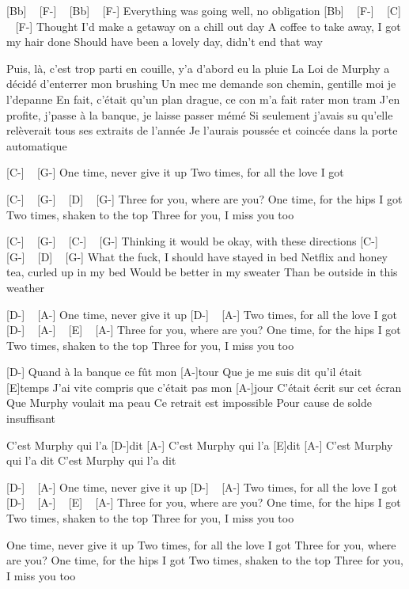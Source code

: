 
[Bb] ~ [F-] ~ [Bb] ~ [F-] 
Everything was going well, no obligation
[Bb] ~ [F-] ~ [C] ~ [F-]
Thought I'd make a getaway on a chill out day
A coffee to take away, I got my hair done
Should have been a lovely day, didn't end that way


Puis, là, c'est trop parti en couille, y'a d'abord eu la pluie
La Loi de Murphy a décidé d'enterrer mon brushing
Un mec me demande son chemin, gentille moi je l'depanne
En fait, c'était qu'un plan drague, ce con m'a fait rater mon tram
J'en profite, j'passe à la banque, je laisse passer mémé
Si seulement j'avais su qu'elle relèverait tous ses extraits de l'année
Je l'aurais poussée et coincée dans la porte automatique

[C-] ~ [G-]
One time, never give it up
Two times, for all the love I got

[C-] ~ [G-] ~ [D] ~ [G-]
Three for you, where are you?
One time, for the hips I got
Two times, shaken to the top
Three for you, I miss you too

[C-] ~ [G-] ~ [C-] ~ [G-]
Thinking it would be okay, with these directions
[C-] ~ [G-] ~ [D] ~ [G-]
What the fuck, I should have stayed in bed
Netflix and honey tea, curled up in my bed
Would be better in my sweater
Than be outside in this weather

[D-] ~ [A-]
One time, never give it up
[D-] ~ [A-]
Two times, for all the love I got
[D-] ~ [A-] ~ [E] ~ [A-]
Three for you, where are you?
One time, for the hips I got
Two times, shaken to the top
Three for you, I miss you too

[D-]
Quand à la banque ce fût mon [A-]tour
Que je me suis dit qu'il était [E]temps
J'ai vite compris que c'était pas mon [A-]jour
C'était écrit sur cet écran
Que Murphy voulait ma peau
Ce retrait est impossible
Pour cause de solde insuffisant

C'est Murphy qui l'a [D-]dit [A-]
C'est Murphy qui l'a [E]dit [A-]
C'est Murphy qui l'a dit
C'est Murphy qui l'a dit


[D-] ~ [A-]
One time, never give it up
[D-] ~ [A-]
Two times, for all the love I got
[D-] ~ [A-] ~ [E] ~ [A-]
Three for you, where are you?
One time, for the hips I got
Two times, shaken to the top
Three for you, I miss you too

One time, never give it up
Two times, for all the love I got
Three for you, where are you?
One time, for the hips I got
Two times, shaken to the top
Three for you, I miss you too

